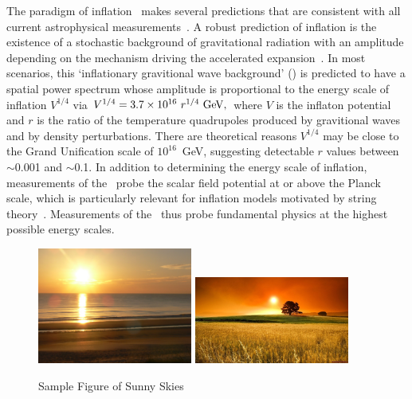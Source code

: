 The paradigm of inflation~\cite{guth81,linde82,albrecht82,sato81,kolb94}
makes several predictions that are consistent with all current astrophysical 
measurements~\cite{spergel06,Tegmark:2006az,planck2015parameters,planck2015inflation}. 
A robust prediction of inflation is the existence of a stochastic background of gravitational radiation 
with an amplitude depending on the mechanism driving the accelerated 
expansion~\cite{starobinsky82,starobinsky83a,rubakov82,grishchuk75,abbott84a}.
In most scenarios, this `inflationary gravitional wave background' (\igb) is predicted
to have a spatial power spectrum whose amplitude is proportional to the energy
scale of inflation $V^{1/4}$ via
$V^{1/4} = 3.7 \times 10^{16} \ r^{1/4}\,\, {\rm GeV},$
where $V$ is the inflaton potential and $r$ is the ratio of the temperature
quadrupoles produced by gravitional waves and by density perturbations.  
There are theoretical reasons $V^{1/4}$ may be close to the Grand
Unification scale of $10^{16}$~GeV, suggesting detectable $r$ values between 
$\sim$0.001 and $\sim$0.1. In addition to determining the energy scale of inflation, measurements 
of the \igb\ probe the scalar field potential at or above the Planck scale, which is particularly relevant for inflation models motivated 
by string theory~\cite{SnowmassInflationTheory}. Measurements of the \igb\ thus probe fundamental physics at the 
highest possible energy scales. 
\begin{figure}[htbp!]
\hspace{0.in}
\parbox{4.2in}{ \centerline {
\includegraphics[width=2.0in] {Figures/sunny_skies.jpg}  
\hspace{0.1in}
\includegraphics[width=2.0in] {Figures/sunny_skies2.jpg}  }  }
\hspace{0.1in}
\parbox{2.in}{
\caption{ \small \setlength{\baselineskip}{0.90\baselineskip}
       Sample Figure of Sunny Skies
\label{fig:sunny_skies} } }   
\vspace{-0.05in}
\end{figure}

